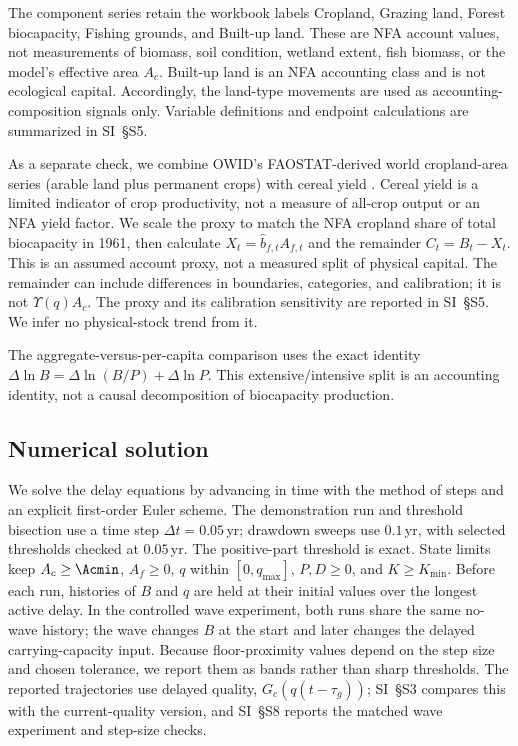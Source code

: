The component series retain the workbook labels Cropland, Grazing land, Forest biocapacity, Fishing grounds, and Built-up land. These are NFA account values, not measurements of biomass, soil condition, wetland extent, fish biomass, or the model's effective area $A_c$. Built-up land is an NFA accounting class and is not ecological capital. Accordingly, the land-type movements are used as accounting-composition signals only. Variable definitions and endpoint calculations are summarized in SI~\S S5.

As a separate check, we combine OWID's FAOSTAT-derived world cropland-area series (arable land plus permanent crops) with cereal yield \citep{OWIDCropland2026,OWIDCereal2026}. Cereal yield is a limited indicator of crop productivity, not a measure of all-crop output or an NFA yield factor. We scale the proxy to match the NFA cropland share of total biocapacity in 1961, then calculate $X_t=\hat b_{f,t}A_{f,t}$ and the remainder $C_t=B_t-X_t$. This is an assumed account proxy, not a measured split of physical capital. The remainder can include differences in boundaries, categories, and calibration; it is not $\Upsilon(q)A_c$. The proxy and its calibration sensitivity are reported in SI~\S S5. We infer no physical-stock trend from it.

The aggregate-versus-per-capita comparison uses the exact identity $\Delta\ln B=\Delta\ln(B/P)+\Delta\ln P$. This extensive/intensive split is an accounting identity, not a causal decomposition of biocapacity production.

\subsection{Numerical solution}\label{sec:numerics}

We solve the delay equations by advancing in time with the method of steps and an explicit first-order Euler scheme. The demonstration run and threshold bisection use a time step $\Delta t=0.05$\,yr; drawdown sweeps use $0.1$\,yr, with selected thresholds checked at $0.05$\,yr. The positive-part threshold is exact. State limits keep $A_c\ge\Acmin$, $A_f\ge0$, $q$ within $[0,q_{\max}]$, $P,D\ge0$, and $K\ge K_{\min}$. Before each run, histories of $B$ and $q$ are held at their initial values over the longest active delay. In the controlled wave experiment, both runs share the same no-wave history; the wave changes $B$ at the start and later changes the delayed carrying-capacity input. Because floor-proximity values depend on the step size and chosen tolerance, we report them as bands rather than sharp thresholds. The reported trajectories use delayed quality, $G_c(q(t-\tau_g))$; SI~\S S3 compares this with the current-quality version, and SI~\S S8 reports the matched wave experiment and step-size checks.
